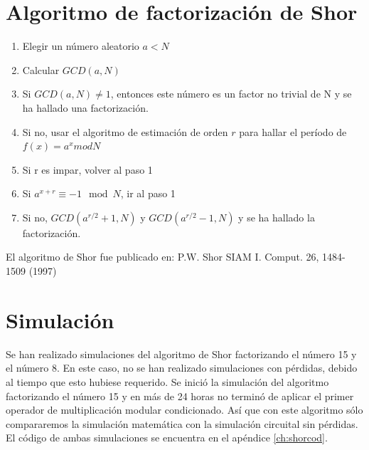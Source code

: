 \section{Algoritmo de factorización de Shor}

\begin{enumerate}
    \item Elegir un número aleatorio $a < N$
    \item Calcular $GCD(a,N)$
    \item Si $GCD(a,N) \neq 1$, entonces este número es un factor no trivial de N y se ha hallado una factorización.
    \item Si no, usar el algoritmo de estimación de orden $r$ para hallar el período de $f(x) = a^x mod N$
    \item Si r es impar, volver al paso 1
    \item Si $a^{x+r} \equiv -1 \mod N$, ir al paso 1
    \item Si no, $GCD(a^{r/2} + 1, N)$ y $GCD(a^{r/2} - 1, N)$ y se ha hallado la factorización.
\end{enumerate}




El algoritmo de Shor fue publicado en: P.W. Shor SIAM I. Comput. 26, 1484-1509 (1997)

\section{Simulación}

Se han realizado simulaciones del algoritmo de Shor factorizando el número 15 y el número 8. En este caso, no se han realizado simulaciones con pérdidas, debido al tiempo que esto hubiese requerido. Se inició la simulación del algoritmo factorizando el número 15 y en más de 24 horas no terminó de aplicar el primer operador de multiplicación modular condicionado. Así que con este algoritmo sólo compararemos la simulación matemática con la simulación circuital sin pérdidas. El código de ambas simulaciones se encuentra en el apéndice \ref{ch:shorcod}.

